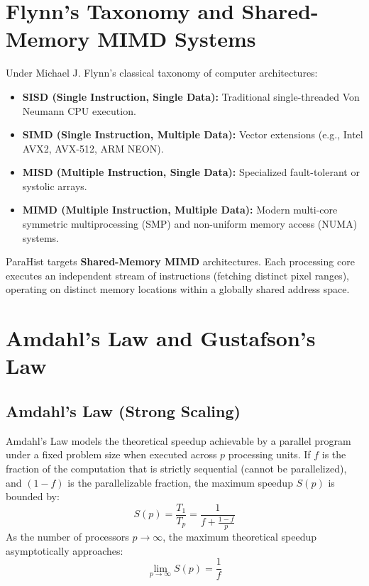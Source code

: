 \documentclass[12pt,a4paper,oneside]{report}
\begin{document}
\section{Flynn's Taxonomy and Shared-Memory MIMD Systems}
Under Michael J. Flynn's classical taxonomy of computer architectures:
\begin{itemize}
    \item \textbf{SISD (Single Instruction, Single Data):} Traditional single-threaded Von Neumann CPU execution.
    \item \textbf{SIMD (Single Instruction, Multiple Data):} Vector extensions (e.g., Intel AVX2, AVX-512, ARM NEON).
    \item \textbf{MISD (Multiple Instruction, Single Data):} Specialized fault-tolerant or systolic arrays.
    \item \textbf{MIMD (Multiple Instruction, Multiple Data):} Modern multi-core symmetric multiprocessing (SMP) and non-uniform memory access (NUMA) systems.
\end{itemize}

ParaHist targets \textbf{Shared-Memory MIMD} architectures. Each processing core executes an independent stream of instructions (fetching distinct pixel ranges), operating on distinct memory locations within a globally shared address space.

\section{Amdahl's Law and Gustafson's Law}

\subsection{Amdahl's Law (Strong Scaling)}
Amdahl's Law models the theoretical speedup achievable by a parallel program under a fixed problem size when executed across $p$ processing units. If $f$ is the fraction of the computation that is strictly sequential (cannot be parallelized), and $(1 - f)$ is the parallelizable fraction, the maximum speedup $S(p)$ is bounded by:
\begin{equation}
    S(p) = \frac{T_1}{T_p} = \frac{1}{f + \frac{1 - f}{p}}
\end{equation}
As the number of processors $p \to \infty$, the maximum theoretical speedup asymptotically approaches:
\begin{equation}
    \lim_{p \to \infty} S(p) = \frac{1}{f}
\end{equation}
\end{document}
